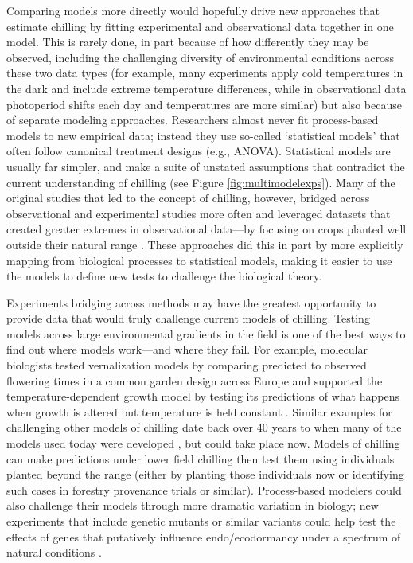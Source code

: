 \documentclass[11pt]{article}
\begin{document}
Comparing models more directly would hopefully drive new approaches that estimate chilling by fitting experimental and observational data together in one model. This is rarely done, in part because of how differently they may be observed, including the challenging diversity of environmental conditions across these two data types (for example, many experiments apply cold temperatures in the dark and include extreme temperature differences, while in observational data photoperiod shifts each day and temperatures are more similar) but also because of separate modeling approaches. Researchers almost never fit process-based models to new empirical data; instead they use so-called `statistical models' that often follow canonical treatment designs (e.g., ANOVA). Statistical models are usually far simpler, and make a suite of unstated assumptions that contradict the current understanding of chilling 
(see Figure \ref{fig:multimodelexps}). Many of the original studies that led to the concept of chilling, however, bridged across observational and experimental studies more often and leveraged datasets that created greater extremes in observational data---by focusing on crops planted well outside their natural range \citep[e.g., peaches in Florida and Israel, ][]{erez1971,richardson1974}. These approaches did this in part by more explicitly mapping from biological processes to statistical models, making it easier to use the models to define new tests to challenge the biological theory. 

Experiments bridging across methods may have the greatest opportunity to provide data that would truly challenge current models of chilling. Testing models across large environmental gradients in the field is one of the best ways to find out where models work---and where they fail. For example, molecular biologists tested vernalization models by comparing predicted to observed flowering times in a common garden design across Europe \citep[][]{Wilczek:2009oa} and supported the temperature-dependent growth model by testing its predictions of what happens when growth is altered but temperature is held constant \citep{zhao2020temperature}. Similar examples for challenging other models of chilling date back over 40 years to when many of the models used today were developed \citep{richardson1974,chuine2016,ospreebbms}, but could take place now. Models of chilling can make predictions under lower field chilling then test them using individuals planted beyond the range (either by planting those individuals now or identifying such cases in forestry provenance trials or similar). Process-based modelers could also challenge their models through more dramatic variation in biology; new experiments that include genetic mutants or similar variants \citep[e.g.,][]{azeez2021early,pan2023epigenetic} could help test the effects of genes that putatively influence endo/ecodormancy under a spectrum of natural conditions \citep{Satake2022}. 
\end{document}
